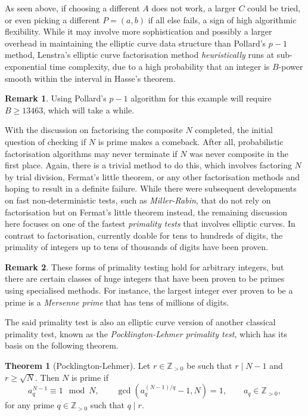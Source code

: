 \documentclass{article}
\newcommand{\Z}{\mathbb{Z}}
\newcommand{\rb}[1]{\left( #1 \right)}
\theoremstyle{definition}
\newtheorem*{remark}{Remark}
\newtheorem{theorem}[proposition]{Theorem}
\begin{document}
As seen above, if choosing a different $ A $ does not work, a larger $ C $ could be tried, or even picking a different $ P = \rb{a, b} $ if all else fails, a sign of high algorithmic flexibility. While it may involve more sophistication and possibly a larger overhead in maintaining the elliptic curve data structure than Pollard's $ p - 1 $ method, Lenstra's elliptic curve factorisation method \emph{heuristically} runs at sub-exponential time complexity, due to a high probability that an integer is $ B $-power smooth within the interval in Hasse's theorem.

\begin{remark}
Using Pollard's $ p - 1 $ algorithm for this example will require $ B \ge 13463 $, which will take a while.
\end{remark}

With the discussion on factorising the composite $ N $ completed, the initial question of checking if $ N $ is prime makes a comeback. After all, probabilistic factorisation algorithms may never terminate if $ N $ was never composite in the first place. Again, there is a trivial method to do this, which involves factoring $ N $ by trial division, Fermat's little theorem, or any other factorisation methods and hoping to result in a definite failure. While there were subsequent developments on fast non-deterministic tests, such as \emph{Miller-Rabin}, that do not rely on factorisation but on Fermat's little theorem instead, the remaining discussion here focuses on one of the fastest \emph{primality tests} that involves elliptic curves. In contrast to factorisation, currently doable for tens to hundreds of digits, the primality of integers up to tens of thousands of digits have been proven.

\begin{remark}
These forms of primality testing hold for arbitrary integers, but there are certain classes of huge integers that have been proven to be primes using specialised methods. For instance, the largest integer ever proven to be a prime is a \emph{Mersenne prime} that has tens of millions of digits.
\end{remark}

The said primality test is also an elliptic curve version of another classical primality test, known as the \emph{Pocklington-Lehmer primality test}, which has its basis on the following theorem.

\begin{theorem}[Pocklington-Lehmer]
\label{thm:pocklington}
Let $ r \in \Z_{> 0} $ be such that $ r \mid N - 1 $ and $ r \ge \sqrt{N} $. Then $ N $ is prime if
$$ a_q^{N - 1} \equiv 1 \mod N, \qquad \gcd\rb{a_q^{\rb{N - 1} / q} - 1, N} = 1, \qquad a_q \in \Z_{> 0}, $$
for any prime $ q \in \Z_{> 0} $ such that $ q \mid r $.
\end{theorem}
\end{document}
